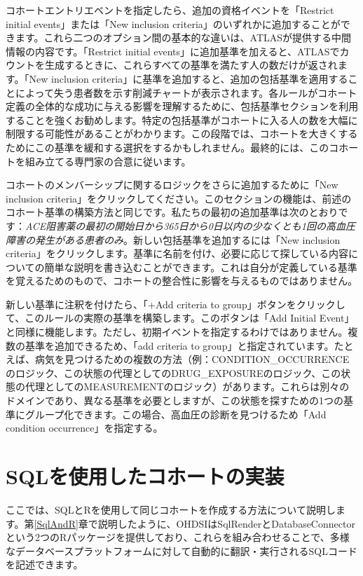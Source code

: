 \documentclass[
  11pt]{book}
\theoremstyle{definition}
\theoremstyle{definition}
\theoremstyle{definition}
\theoremstyle{definition}
\theoremstyle{remark}
\begin{document}
コホートエントリエベントを指定したら、追加の資格イベントを「Restrict initial events」または「New inclusion criteria」のいずれかに追加することができます。これら二つのオプション間の基本的な違いは、ATLASが提供する中間情報の内容です。「Restrict initial events」に追加基準を加えると、ATLASでカウントを生成するときに、これらすべての基準を満たす人の数だけが返されます。「New inclusion criteria」に基準を追加すると、追加の包括基準を適用することによって失う患者数を示す削減チャートが表示されます。各ルールがコホート定義の全体的な成功に与える影響を理解するために、包括基準セクションを利用することを強くお勧めします。特定の包括基準がコホートに入る人の数を大幅に制限する可能性があることがわかります。この段階では、コホートを大きくするためにこの基準を緩和する選択をするかもしれません。最終的には、このコホートを組み立てる専門家の合意に従います。

コホートのメンバーシップに関するロジックをさらに追加するために「New inclusion criteria」をクリックしてください。このセクションの機能は、前述のコホート基準の構築方法と同じです。私たちの最初の追加基準は次のとおりです：\emph{ACE阻害薬の最初の開始日から365日から0日以内の少なくとも1回の高血圧障害の発生がある患者のみ}。新しい包括基準を追加するには「New inclusion criteria」をクリックします。基準に名前を付け、必要に応じて探している内容についての簡単な説明を書き込むことができます。これは自分が定義している基準を覚えるためのもので、コホートの整合性に影響を与えるものではありません。

新しい基準に注釈を付けたら、「+Add criteria to group」ボタンをクリックして、このルールの実際の基準を構築します。このボタンは「Add Initial Event」と同様に機能します。ただし、初期イベントを指定するわけではありません。複数の基準を追加できるため、「add criteria to group」と指定されています。たとえば、病気を見つけるための複数の方法（例：CONDITION\_OCCURRENCEのロジック、この状態の代理としてのDRUG\_EXPOSUREのロジック、この状態の代理としてのMEASUREMENTのロジック）があります。これらは別々のドメインであり、異なる基準を必要としますが、この状態を探すための1つの基準にグループ化できます。この場合、高血圧の診断を見つけるため「Add condition occurrence」を指定する。

\section{SQLを使用したコホートの実装}\label{sqlux3092ux4f7fux7528ux3057ux305fux30b3ux30dbux30fcux30c8ux306eux5b9fux88c5}

ここでは、SQLとRを使用して同じコホートを作成する方法について説明します。第\ref{SqlAndR}章で説明したように、OHDSIはSqlRenderとDatabaseConnectorという2つのRパッケージを提供しており、これらを組み合わせることで、多様なデータベースプラットフォームに対して自動的に翻訳・実行されるSQLコードを記述できます。
\end{document}
